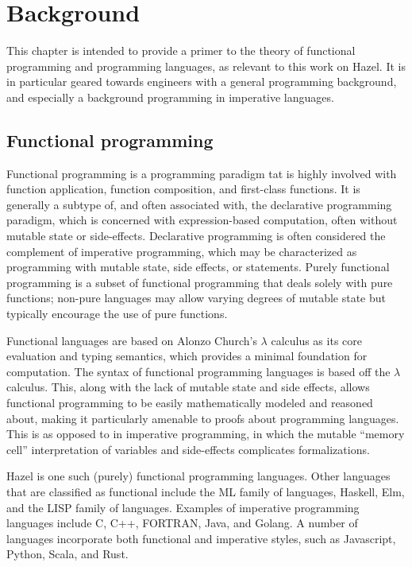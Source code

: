 \section{Background}
\label{sec:background}

This chapter is intended to provide a primer to the theory of functional programming and programming languages, as relevant to this work on Hazel. It is in particular geared towards engineers with a general programming background, and especially a background programming in imperative languages.

\subsection{Functional programming}
\label{sec:fp}

Functional programming is a programming paradigm tat is highly involved with function application, function composition, and first-class functions. It is generally a subtype of, and often associated with, the declarative programming paradigm, which is concerned with expression-based computation, often without mutable state or side-effects. Declarative programming is often considered the complement of imperative programming, which may be characterized as programming with mutable state, side effects, or statements. Purely functional programming is a subset of functional programming that deals solely with pure functions; non-pure languages may allow varying degrees of mutable state but typically encourage the use of pure functions.

Functional languages are based on Alonzo Church's $\lambda$ calculus as its core evaluation and typing semantics, which provides a minimal foundation for computation. The syntax of functional programming languages is based off the $\lambda$ calculus. This, along with the lack of mutable state and side effects, allows functional programming to be easily mathematically modeled and reasoned about, making it particularly amenable to proofs about programming languages. This is as opposed to in imperative programming, in which the mutable ``memory cell'' interpretation of variables and side-effects complicates formalizations.

Hazel is one such (purely) functional programming languages. Other languages that are classified as functional include the ML family of languages, Haskell, Elm, and the LISP family of languages. Examples of imperative programming languages include C, C++, FORTRAN, Java, and Golang. A number of languages incorporate both functional and imperative styles, such as Javascript, Python, Scala, and Rust.

